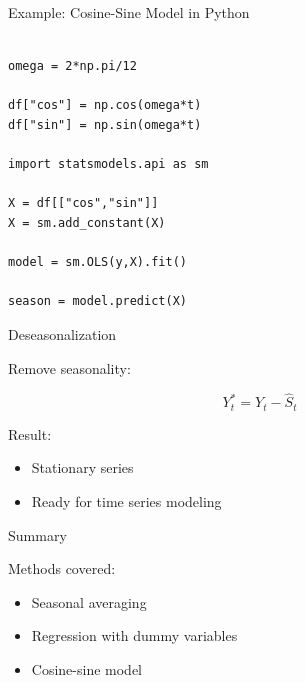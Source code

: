 \documentclass[aspectratio=169]{beamer}
\begin{document}
\begin{frame}[fragile]{Example: Cosine-Sine Model in Python}

\begin{lstlisting}

omega = 2*np.pi/12

df["cos"] = np.cos(omega*t)
df["sin"] = np.sin(omega*t)

import statsmodels.api as sm

X = df[["cos","sin"]]
X = sm.add_constant(X)

model = sm.OLS(y,X).fit()

season = model.predict(X)

\end{lstlisting}

\end{frame}

\begin{frame}{Deseasonalization}

Remove seasonality:

\[
Y_t^{*} =
Y_t -
\hat{S}_t
\]

Result:

\begin{itemize}

\item Stationary series

\item Ready for time series modeling

\end{itemize}

\end{frame}

\begin{frame}{Summary}

Methods covered:

\begin{itemize}

\item Seasonal averaging

\item Regression with dummy variables

\item Cosine-sine model

\end{itemize}

\end{frame}

\end{document}

